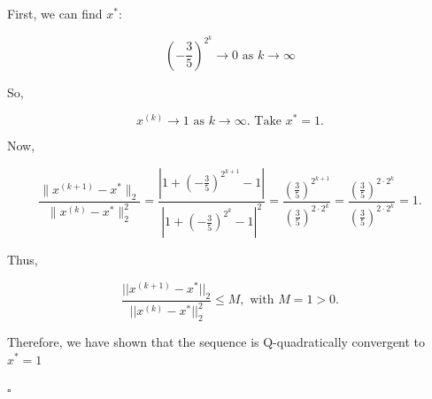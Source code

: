 \documentclass[12pt]{article}
\begin{document}
\vspace{3mm}

First, we can find $x^{*}$:

\[ (-\frac{3}{5})^{2^k} \rightarrow 0 \text{ as } k \rightarrow \infty\]
\vspace{3mm}

So,

\[x^{(k)} \rightarrow 1 \text{ as } k \rightarrow \infty. \text{ Take } x^{*} = 1.\]

\vspace{3mm}
Now,



\[
\frac{\|x^{(k+1)} - x^*\|_2}{\|x^{(k)} - x^*\|_2^2}
= \frac{\left|1 + (-\frac{3}{5})^{2^{k+1}} - 1 \right|}{\left|1 + (-\frac{3}{5})^{2^k} - 1\right|^2}
= \frac{\left(\frac{3}{5}\right)^{2^{k+1}}}{\left(\frac{3}{5}\right)^{2\cdot 2^k}}
= \frac{\left(\frac{3}{5}\right)^{2\cdot 2^k}}{\left(\frac{3}{5}\right)^{2\cdot 2^k}}
= 1.
\]




\vspace{3mm}

Thus,

\[ \frac{||x^{(k+1)} - x^{*}||_{2}}{||x^{(k)} - x^{*}||_{2}^{2}} \leq M, \text{ with } M = 1 > 0. \]

\vspace{3mm}

Therefore, we have shown that the sequence is Q-quadratically convergent to $x^{*} = 1 $

\begin{flushright}
$\square$
\end{flushright}
\end{document}
